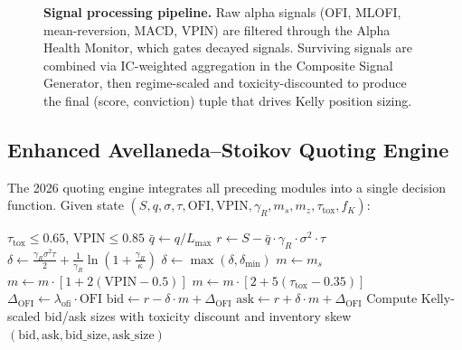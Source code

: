 \documentclass[11pt]{article}
\theoremstyle{definition}
\begin{document}
\begin{figure}[H]
\caption{\textbf{Signal processing pipeline.} Raw alpha signals (OFI, MLOFI, mean-reversion, MACD, VPIN) are filtered through the Alpha Health Monitor, which gates decayed signals. Surviving signals are combined via IC-weighted aggregation in the Composite Signal Generator, then regime-scaled and toxicity-discounted to produce the final (score, conviction) tuple that drives Kelly position sizing.}
\label{fig:signal-pipeline}
\end{figure}

\subsection{Enhanced Avellaneda--Stoikov Quoting Engine}
\label{sec:quoting}

The 2026 quoting engine integrates all preceding modules into a
single decision function. Given state
$(S, q, \sigma, \tau, \text{OFI}, \text{VPIN}, \gamma_R, m_s, m_z,
\tau_{\text{tox}}, f_K)$:

\begin{algorithm}[H]
\caption{Enhanced Avellaneda--Stoikov Quoting}
\label{alg:quoting}
\begin{algorithmic}[1]
\Require $\tau_{\text{tox}} \leq 0.65$, $\text{VPIN} \leq 0.85$
\State $\bar{q} \gets q / L_{\max}$
\State $r \gets S - \bar{q} \cdot \gamma_R \cdot \sigma^2 \cdot \tau$
\State $\delta \gets \frac{\gamma_R \sigma^2 \tau}{2} +
  \frac{1}{\gamma_R} \ln\!\left(1 + \frac{\gamma_R}{\kappa}\right)$
\State $\delta \gets \max(\delta, \delta_{\min})$
\State $m \gets m_s$
  \State $m \gets m \cdot [1 + 2(\text{VPIN} - 0.5)]$
\EndIf
{}
  \State $m \gets m \cdot [2 + 5(\tau_{\text{tox}} - 0.35)]$
\EndIf
\State $\Delta_{\text{OFI}} \gets \lambda_{\text{ofi}} \cdot \text{OFI}$
\State $\text{bid} \gets r - \delta \cdot m + \Delta_{\text{OFI}}$
\State $\text{ask} \gets r + \delta \cdot m + \Delta_{\text{OFI}}$
\State Compute Kelly-scaled bid/ask sizes with toxicity discount
  and inventory skew
\State \Return $(\text{bid}, \text{ask}, \text{bid\_size},
  \text{ask\_size})$
\end{algorithmic}
\end{algorithm}
\end{document}
